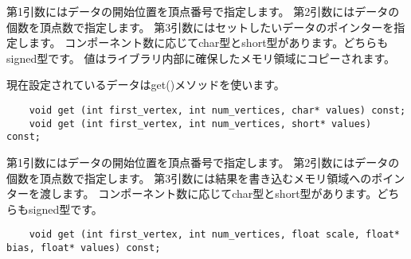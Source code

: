 第1引数にはデータの開始位置を頂点番号で指定します。
第2引数にはデータの個数を頂点数で指定します。
第3引数にはセットしたいデータのポインターを指定します。
コンポーネント数に応じてchar型とshort型があります。どちらもsigned型です。
値はライブラリ内部に確保したメモリ領域にコピーされます。

現在設定されているデータはget()メソッドを使います。

\begin{verbatim}
    void get (int first_vertex, int num_vertices, char* values) const;
    void get (int first_vertex, int num_vertices, short* values) const;
\end{verbatim}

第1引数にはデータの開始位置を頂点番号で指定します。
第2引数にはデータの個数を頂点数で指定します。
第3引数には結果を書き込むメモリ領域へのポインターを渡します。
コンポーネント数に応じてchar型とshort型があります。どちらもsigned型です。



\begin{verbatim}
    void get (int first_vertex, int num_vertices, float scale, float* bias, float* values) const;
\end{verbatim}


